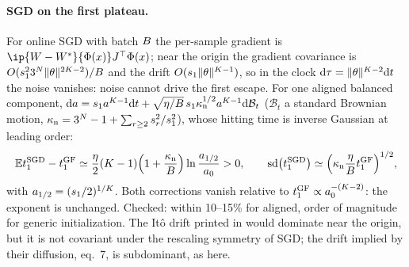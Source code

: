 \paragraph{SGD on the first plateau.} \derived{} 
For online SGD with batch $B$ the per-sample gradient is $\ip{\W-\Wt}{\Feat(x)}J\T\Feat(x)$; near the origin
the gradient covariance is $O(s_{1}^23^N\lVert\theta\rVert^{2K-2})/B$ and the drift $O(s_{1}\lVert\theta\rVert^{K-1})$, so in
the clock $\mathrm{d}\tau=\lVert\theta\rVert^{K-2}\mathrm{d} t$ the noise vanishes: noise cannot drive the first escape. For one
aligned balanced component,
$\mathrm{d} a=s_{1}a^{K-1}\mathrm{d} t+\sqrt{\eta/B}\,s_{1}\kappa_{\rm n}^{1/2}a^{K-1}\mathrm{d}\mathcal B_t$ ($\mathcal B_t$ a standard Brownian
motion, $\kappa_{\rm n}=3^N-1+\sum_{r\ge2}s_{r}^2/s_{1}^2$), whose hitting time is inverse Gaussian at leading order:
\begin{equation}\label{eq:A-sgd-first}
  \mathbb{E}t_{1}^{\rm SGD}-t_{1}^{\rm GF}\simeq\frac{\eta}2(K-1)\Big(1+\frac{\kappa_{\rm n}}{B}\Big)\ln\frac{a_{1/2}}{a_0}>0,\qquad
  \mathrm{sd}\big(t_{1}^{\rm SGD}\big)\simeq\Big(\kappa_{\rm n}\frac{\eta}{B}t_{1}^{\rm GF}\Big)^{1/2},
\end{equation}
with $a_{1/2}=(s_{1}/2)^{1/K}$. Both corrections vanish relative to $t_{1}^{\rm GF}\propto a_0^{-(K-2)}$: the exponent is
unchanged. Checked: within 10--15\% for aligned, order of magnitude for generic initialization. The It\^o drift
printed in \citet[eq.~6]{corlouer2026stochastic} would dominate near the origin, but it is not covariant under
the rescaling symmetry of SGD; the drift implied by their diffusion, eq.~7, is subdominant, as here.

